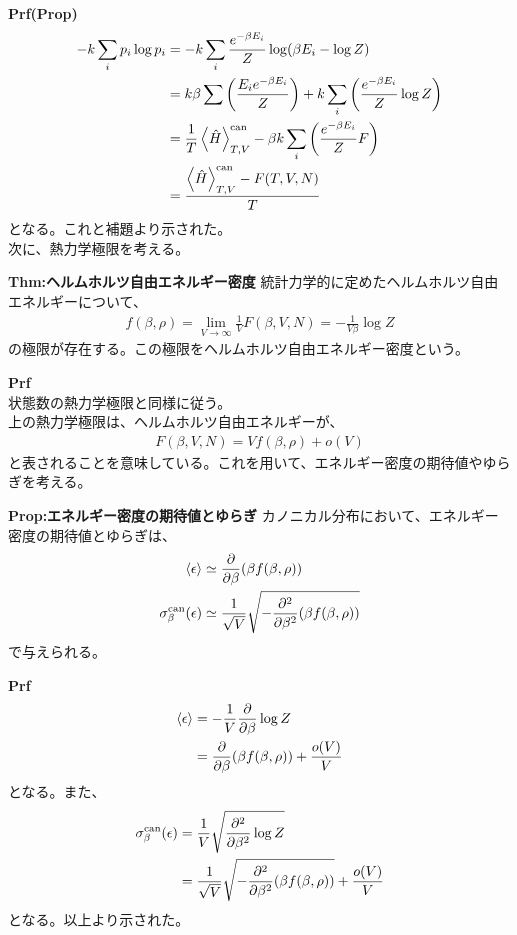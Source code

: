 \documentclass[a4paper,11pt]{jsarticle}
\numberwithin{equation}{section}
\begin{document}
\textbf{Prf(Prop)}\\
\begin{align}
  -k\sum_{i}p_{i}\log p_{i} &= -k\sum_{i}\frac{e^{-\beta E_{i}}}{Z}\log(\beta E_i-\log Z)\\
  &= k\beta \sum\left(\frac{E_{i}e^{-\beta E_{i}}}{Z}\right) + k\sum_{i}\left(\frac{e^{-\beta E_{i}}}{Z}\log Z\right)\\
  &= \frac{1}{T}\ev{\hat{H}}_{T,V}^{\text{can}} -\beta k\sum_i\left(\frac{e^{-\beta E_{i}}}{Z}F\right)\\
  &= \frac{\ev{\hat{H}}_{T,V}^{\text{can}} - F(T,V,N)}{T}
\end{align}
となる。これと補題より示された。\hfill\qedsymbol\\

次に、熱力学極限を考える。
\begin{itembox}[l]{\textbf{Thm:ヘルムホルツ自由エネルギー密度}}
  統計力学的に定めたヘルムホルツ自由エネルギーについて、
\begin{align}
  f(\beta,\rho)= \lim_{V\rightarrow \infty} \frac{1}{V}F(\beta,V,N) = -\frac{1}{V\beta}\log Z
\end{align}
の極限が存在する。この極限をヘルムホルツ自由エネルギー密度という。
\end{itembox}
\textbf{Prf}\\
状態数の熱力学極限と同様に従う。\hfill\qedsymbol\\

上の熱力学極限は、ヘルムホルツ自由エネルギーが、
\begin{align}
  F(\beta,V,N) = Vf(\beta,\rho) + o(V)
\end{align}
と表されることを意味している。これを用いて、エネルギー密度の期待値やゆらぎを考える。

\begin{itembox}[l]{\textbf{Prop:エネルギー密度の期待値とゆらぎ}}
  カノニカル分布において、エネルギー密度の期待値とゆらぎは、
  \begin{align}
    \expval{\epsilon} &\simeq \pdv{\beta}(\beta f(\beta,\rho))\\
    \sigma_{\beta}^{\text{can}} (\epsilon) &\simeq \frac{1}{\sqrt{V}}\sqrt{-\pdv[2]{\beta}(\beta f(\beta,\rho))}
  \end{align}
  で与えられる。
\end{itembox}
\textbf{Prf}\\
\begin{align}
  \expval{\epsilon} &= -\frac{1}{V}\pdv{\beta}\log Z\\
  &= \pdv{\beta}(\beta f(\beta,\rho))+\frac{o(V)}{V}
\end{align}
となる。また、
\begin{align}
  \sigma_{\beta}^{\text{can}} (\epsilon) &= \frac{1}{V}\sqrt{\pdv[2]{\beta}\log Z}\\
  &= \frac{1}{\sqrt{V}}\sqrt{-\pdv[2]{\beta}(\beta f(\beta,\rho))} + \frac{o(V)}{V}
\end{align}
となる。以上より示された。\hfill\qedsymbol\\
\end{document}
